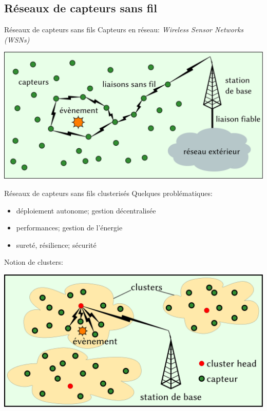 \documentclass[aspectratio=43]{beamer} %
\begin{document}
\subsection[WSNs]{Réseaux de capteurs sans fil}
\begin{frame}{Réseaux de capteurs sans fils}
  Capteurs en réseau: \textit{Wireless Sensor Networks (WSNs)}

  \bigskip\centering
  \includegraphics[height=.5\textheight]{Figs/WSN_archi.pdf}
\end{frame}
\begin{frame}{Réseaux de capteurs sans fils clusterisés}
  Quelques problématiques:
  \begin{itemize}
    \item déploiement autonome; gestion décentralisée
    \item performances; gestion de l'énergie
    \item sureté, résilience; \alert{sécurité}
  \end{itemize}
  \vfill
  Notion de \alert{clusters}:

  \smallskip
  \centering
  \includegraphics[height=.5\textheight]{Figs/WSN.pdf}
\end{frame}
\end{document}
